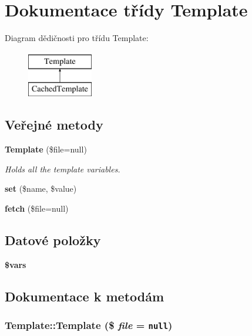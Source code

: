 \section{Dokumentace třídy Template}
\label{classTemplate}
Diagram dědičnosti pro třídu Template:\begin{figure}[H]
\begin{center}
\leavevmode
\includegraphics[height=2cm]{classTemplate}
\end{center}
\end{figure}
\subsection*{Veřejné metody}
\begin{CompactItemize}
\item 
{\bf Template} (\$file=null)
\begin{CompactList}\small\item\em Holds all the template variables. \item\end{CompactList}\item 
{\bf set} (\$name, \$value)
\item 
{\bf fetch} (\$file=null)
\end{CompactItemize}
\subsection*{Datové položky}
\begin{CompactItemize}
\item 
{\bf \$vars}
\end{CompactItemize}


\subsection{Dokumentace k metodám}
\subsubsection{\setlength{\rightskip}{0pt plus 5cm}Template::Template (\$ {\em file} = {\tt null})}\label{classTemplate_4b9d12f1073d2c9a7e5608f0034810d4}



